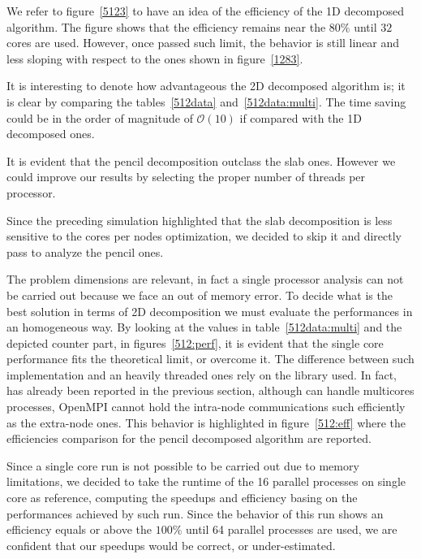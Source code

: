 \par
We refer to figure~\ref{5123} to have an idea of the efficiency of the 1D decomposed algorithm. The figure shows that the efficiency remains near the $80\%$ until $32$ cores are used. However, once passed such limit, the behavior is still linear and less sloping with  respect to the ones shown in figure~\ref{1283}.  \\
\par
It is interesting to denote how advantageous the 2D decomposed algorithm is; it is clear by comparing the tables~\ref{512data} and~\ref{512data:multi}. The time saving could be in the order of magnitude of $\mathcal{O}(10)$ if compared with the 1D decomposed ones.\\
\par
It is evident that the pencil decomposition outclass the slab ones. However we could improve our results by selecting the proper number of threads per processor. 
\par
Since the preceding simulation highlighted that the slab decomposition is less sensitive to the cores per nodes optimization, we decided to skip it and directly pass to analyze the pencil ones. \par
The problem dimensions are relevant, in fact a single processor analysis can not be carried out because we face an out of memory error.
To decide what is the best solution in terms of 2D decomposition we must evaluate the performances in an homogeneous way. 
By looking at the values in table~\ref{512data:multi} and the depicted counter part, in figures~\ref{512:perf}, it is evident that the single core performance fits the theoretical limit, or overcome it. The difference between such implementation and an heavily threaded ones rely on the library used. In fact, has already been reported in the previous section, although can handle multicores processes, OpenMPI cannot hold the intra-node communications such efficiently as the extra-node ones. This behavior is highlighted in figure~\ref{512:eff} where the efficiencies comparison for the pencil decomposed algorithm are reported.
\par
Since a single core run is not possible to be carried out due to memory limitations, we decided to take the runtime of the 16 parallel processes on single core as reference, computing the speedups and efficiency basing on the performances achieved by such run. Since the behavior of this run shows an efficiency equals or above the $100\%$ until 64 parallel processes are used, we are confident that our speedups would be correct, or under-estimated.

